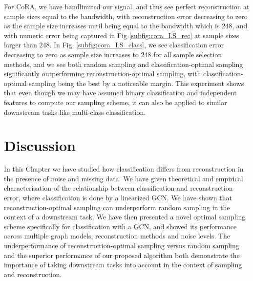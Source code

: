 For CoRA, we have bandlimited our signal, and thus see perfect reconstruction at sample sizes equal to the bandwidth, with reconstruction error decreasing to zero as the sample size increases until being equal to the bandwidth which is 248, and with numeric error being captured in Fig \ref{subfig:cora_LS_rec} at sample sizes larger than 248. In Fig. \ref{subfig:cora_LS_class}, we see classification error decreasing to zero as sample size increases to 248 for all sample selection methods, and we see both random sampling and classification-optimal sampling significantly outperforming reconstruction-optimal sampling, with classification-optimal sampling being the best by a noticeable margin. This experiment shows that even though we may have assumed binary classification and independent features to compute our sampling scheme, it can also be applied to similar downstream tasks like multi-class classification.



\section{Discussion}
In this Chapter we have studied how classification differs from reconstruction in the presence of noise and missing data. We have given theoretical and empirical characterisation of the relationship between classification and reconstruction error, where classification is done by a linearized GCN. We have shown that reconstruction-optimal sampling can underperform random sampling in the context of a downstream task. We have then presented a novel optimal sampling scheme specifically for classification with a GCN, and showed its performance across multiple graph models, reconstruction methods and noise levels. The underperformance of reconstruction-optimal sampling versus random sampling and the superior performance of our proposed algorithm both demonstrate the importance of taking downstream tasks into account in the context of sampling and reconstruction.

